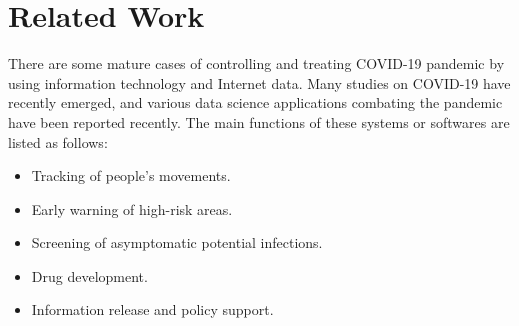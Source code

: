 \documentclass[sigplan,screen]{acmart}
\begin{document}
\section{Related Work}
There are some mature cases of controlling and treating COVID-19 pandemic by using information technology and Internet data.
Many studies on COVID-19 have recently emerged, and various data science applications combating the pandemic have been reported recently\cite{latif2020leveraging}.
The main functions of these systems or softwares are listed as follows:\cite{jia2020big}
\begin{itemize}
	\item Tracking of people's movements.
	\item Early warning of high-risk areas.
	\item Screening of asymptomatic potential infections.
	\item Drug development.
	\item Information release and policy support.
\end{itemize}
\end{document}
